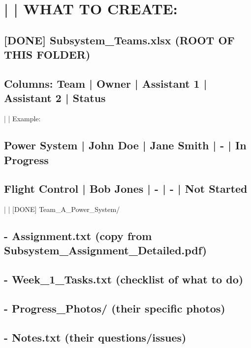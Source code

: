 \documentclass[11pt,letterpaper]{article}
\begin{document}
{{{{\section{|   |   WHAT TO CREATE:}

\subsection*{[DONE] Subsystem\_Teams.xlsx (ROOT OF THIS FOLDER)}

\subsection*{Columns: Team | Owner | Assistant 1 | Assistant 2 | Status}

|   |       Example:\par

\subsection*{Power System    | John Doe  | Jane Smith | -         | In Progress}

\subsection*{Flight Control  | Bob Jones | -          | -         | Not Started}

|   |   [DONE] Team\_A\_Power\_System/\par

\subsection*{- Assignment.txt (copy from Subsystem\_Assignment\_Detailed.pdf)}

\subsection*{- Week\_1\_Tasks.txt (checklist of what to do)}

\subsection*{- Progress\_Photos/ (their specific photos)}

\subsection*{- Notes.txt (their questions/issues)}

}}}}
\end{document}
